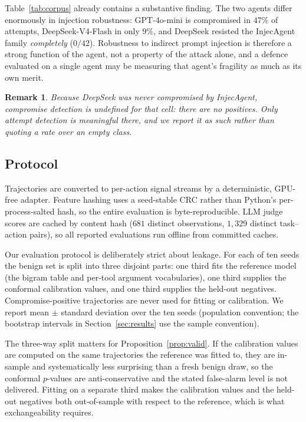 \documentclass[pdflatex,sn-basic]{sn-jnl}%
\theoremstyle{thmstyleone}
\theoremstyle{thmstyletwo}
\newtheorem{remark}{Remark}
\theoremstyle{thmstylethree}
\begin{document}
Table~\ref{tab:corpus} already contains a substantive finding. The two agents
differ enormously in injection robustness: GPT-4o-mini is compromised in $47\%$
of attempts, DeepSeek-V4-Flash in only $9\%$, and DeepSeek resisted the
InjecAgent family \emph{completely} ($0/42$). Robustness to indirect prompt
injection is therefore a strong function of the agent, not a property of the
attack alone, and a defence evaluated on a single agent may be measuring that
agent's fragility as much as its own merit.

\begin{remark}
Because DeepSeek was never compromised by InjecAgent, compromise detection is
\emph{undefined} for that cell: there are no positives. Only attempt detection is
meaningful there, and we report it as such rather than quoting a rate over an
empty class.
\end{remark}

\subsection{Protocol}\label{sec:protocol}

Trajectories are converted to per-action signal streams by a deterministic,
GPU-free adapter. Feature hashing uses a seed-stable CRC rather than Python's
per-process-salted hash, so the entire evaluation is byte-reproducible. LLM judge
scores are cached by content hash ($681$ distinct observations, $1{,}329$ distinct
task--action pairs), so all reported evaluations run offline from committed
caches.

Our evaluation protocol is deliberately strict about leakage. For each of ten
seeds the benign set is split into three disjoint parts: one third fits the
reference model (the bigram table and per-tool argument vocabularies), one third
supplies the conformal calibration values, and one third supplies the held-out
negatives. Compromise-positive trajectories are never used for fitting or
calibration. We report mean $\pm$ standard deviation over the ten seeds (population
convention; the bootstrap intervals in Section~\ref{sec:results} use the sample
convention).

The three-way split matters for Proposition~\ref{prop:valid}. If the calibration
values are computed on the same trajectories the reference was fitted to, they are
in-sample and systematically less surprising than a fresh benign draw, so the
conformal $p$-values are anti-conservative and the stated false-alarm level is not
delivered. Fitting on a separate third makes the calibration values and the
held-out negatives both out-of-sample with respect to the reference, which is what
exchangeability requires.
\end{document}
